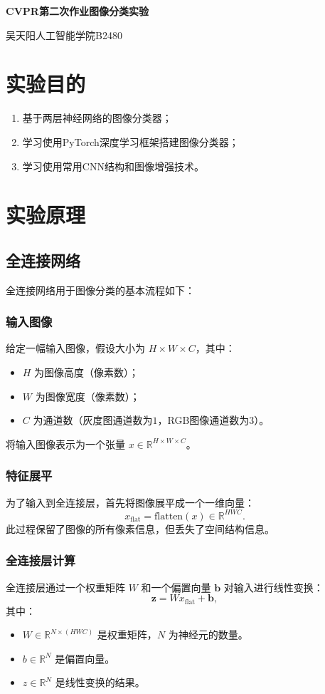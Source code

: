 \documentclass[12pt, a4paper, oneside]{ctexart}
\numberwithin{equation}{section}  %
\newenvironment{myTitle}[1]{
    \begin{center}
    {\zihao{-2}\bf #1\\}
    \zihao{-4}\it
}{\end{center}}  %
\def\bd{\boldsymbol}        %
\begin{document}
\clearpage
\begin{myTitle}{CVPR第二次作业\quad 图像分类实验}
    吴天阳\quad 人工智能学院B2480
\end{myTitle}
\section{实验目的}
\begin{enumerate}
    \item 基于两层神经网络的图像分类器；
    \item 学习使用PyTorch深度学习框架搭建图像分类器；
    \item 学习使用常用CNN结构和图像增强技术。
\end{enumerate}
\section{实验原理}
\subsection{全连接网络}

全连接网络用于图像分类的基本流程如下：

\subsubsection{输入图像}
给定一幅输入图像，假设大小为 $H \times W \times C$，其中：
\begin{itemize}
    \item $H$ 为图像高度（像素数）；
    \item $W$ 为图像宽度（像素数）；
    \item $C$ 为通道数（灰度图通道数为$1$，RGB图像通道数为$3$）。
\end{itemize}
将输入图像表示为一个张量 $x \in \mathbb{R}^{H \times W \times C}$。

\subsubsection{特征展平}
为了输入到全连接层，首先将图像展平成一个一维向量：
\[
x_{\text{flat}} = \text{flatten}(x) \in \mathbb{R}^{H W C}.
\]
此过程保留了图像的所有像素信息，但丢失了空间结构信息。

\subsubsection{全连接层计算}
全连接层通过一个权重矩阵 $W$ 和一个偏置向量 $\bd{b}$ 对输入进行线性变换：
\[
\bd{z} = W x_{\text{flat}} + \bd{b},
\]
其中：
\begin{itemize}
    \item $W \in \mathbb{R}^{N \times (H W C)}$ 是权重矩阵，$N$ 为神经元的数量。
    \item $b \in \mathbb{R}^{N}$ 是偏置向量。
    \item $z \in \mathbb{R}^N$ 是线性变换的结果。
\end{itemize}
\end{document}
